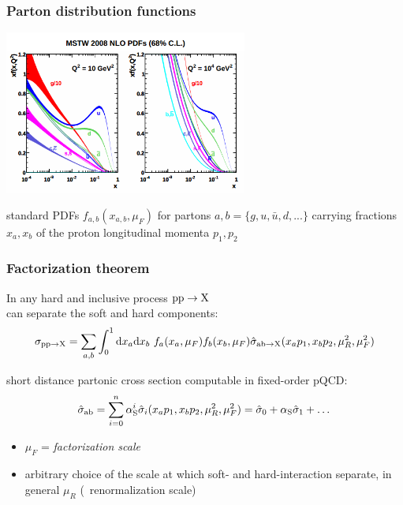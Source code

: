 \begin{frame}\frametitle{Parton distribution functions}
\centering\small

  \includegraphics[width=0.6\textwidth]{../montecarlo/figures/pdfs2.png}

\myskip
standard PDFs $f_{a,b}(x_{a,b},\mu_{F})$ 
for partons $a,b = \{g,u,\bar{u},d,...\}$ 
 carrying fractions $x_a,x_b$ of the proton longitudinal momenta
$p_1, p_2$
\end{frame}



\begin{frame}\frametitle{Factorization theorem}
\centering\myskip

In any {\cccolor hard and inclusive} process ${\rm pp}\to{\rm X}$\\
can separate the {\cccolor soft} and {\cccolor hard} components:
$$
  \sigma_{{\rm pp}\to{\rm X}}
  = \sum_{a,b}
  \int_{0}^{1}{\rm d}x_a{\rm d}x_b
  ~ f_a(x_a,\mu_{F}) f_b(x_b,\mu_{F})
  \hat{\sigma}_{{\rm ab}\to{\rm X}}(x_ap_1, x_bp_2,\mu_R^2,\mu_{F}^2)
$$

short distance partonic cross section computable in fixed-order pQCD:
$$\hat{\sigma}_{{\rm ab}}=\sum_{i=0}^{n} \alphas^i \hat{\sigma}_i(x_ap_1, x_bp_2,\mu_R^2,\mu_{F}^2)=\hat{\sigma}_0+\alphas \hat{\sigma}_1+\dots$$

\begin{itemize}
\item $\mu_{F}$ = {\it factorization scale} 
\item arbitrary choice of the scale at which soft- and hard-interaction separate, in general $\mu_{R}$ (\alphas\ renormalization scale)
\end{itemize}

\end{frame}

